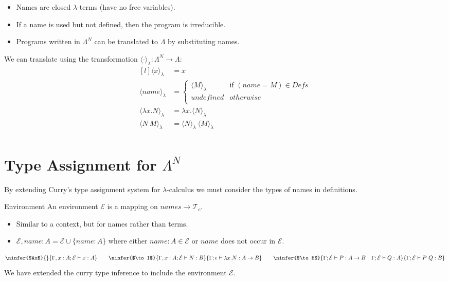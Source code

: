 \begin{itemize}
	\item Names are closed $\lambda$-terms (have no free variables).
	\item If a name is used but not defined, then the program is irreducible.
	\item Programs written in $\Lambda^N$ can be translated to $\Lambda$ by substituting names.
\end{itemize}
We can translate using the transformation $\langle \cdot \rangle_\lambda : \Lambda^N \to \Lambda$:
\[\begin{matrix*}[l]
		\langle x \rangle_\lambda & = x \\
		\langle name \rangle_\lambda & = \begin{cases}
			\langle M \rangle_\lambda & \text{if } (name = M) \in Defs \\
			undefined                 & otherwise                      \\
		\end{cases} \\
		\langle \lambda x . N \rangle_\lambda & = \lambda x . \langle N \rangle_\lambda \\
		\langle  N \ M \rangle_\lambda & = \langle N \rangle_\lambda \ \langle M \rangle_\lambda \\
	\end{matrix*}\]

\section{Type Assignment for $\Lambda^N$}
By extending Curry's type assignment system for $\lambda$-calculus we must consider the types of names in definitions.
\begin{definitionbox}{Environment}
	An environment $\mathcal{E}$ is a mapping on $names \to \mathcal{T}_c$.
	\begin{itemize}
		\item Similar to a context, but for names rather than terms.
		\item $\mathcal{E}, name:A = \mathcal{E} \cup \{ name: A \}$ where either $name : A \in \mathcal{E}$ or $name$ does not occur in $\mathcal{E}$.
	\end{itemize}
\end{definitionbox}

\[\ninfer{$Ax$}{}{\Gamma, x:A; \mathcal{E} \vdash x : A}
	\qquad \ninfer{$\to I$}{\Gamma, x:A ; \mathcal{E} \vdash N : B}{\Gamma ; \epsilon \vdash \lambda x . N : A \to B}
	\qquad \ninfer{$\to E$}{\Gamma; \mathcal{E} \vdash P : A \to B \quad \Gamma ; \mathcal{E} \vdash Q : A}{\Gamma ; \mathcal{E} \vdash P \ Q : B}\]
We have extended the curry type inference to include the environment $\mathcal{E}$.

